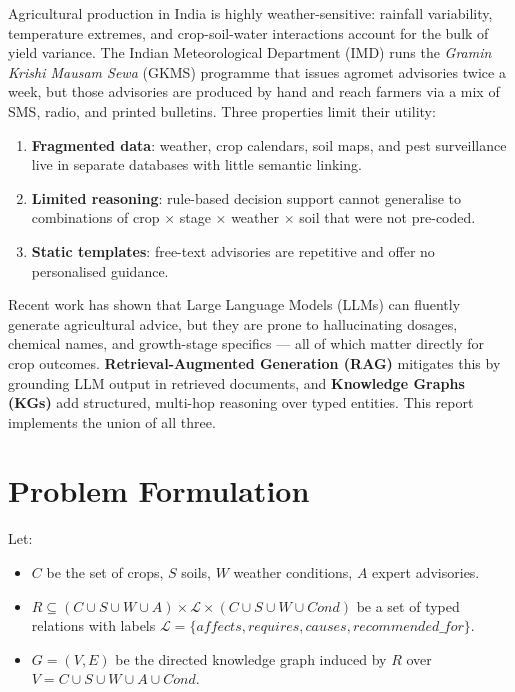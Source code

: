 \documentclass[11pt,a4paper]{article}
\begin{document}
Agricultural production in India is highly weather-sensitive: rainfall
variability, temperature extremes, and crop-soil-water interactions
account for the bulk of yield variance. The Indian Meteorological
Department (IMD) runs the \emph{Gramin Krishi Mausam Sewa} (GKMS)
programme that issues agromet advisories twice a week, but those
advisories are produced by hand and reach farmers via a mix of SMS,
radio, and printed bulletins. Three properties limit their utility:

\begin{enumerate}[leftmargin=*]
  \item \textbf{Fragmented data}: weather, crop calendars, soil maps,
        and pest surveillance live in separate databases with little
        semantic linking.
  \item \textbf{Limited reasoning}: rule-based decision support cannot
        generalise to combinations of crop $\times$ stage $\times$
        weather $\times$ soil that were not pre-coded.
  \item \textbf{Static templates}: free-text advisories are repetitive
        and offer no personalised guidance.
\end{enumerate}

Recent work has shown that Large Language Models (LLMs) can fluently
generate agricultural advice, but they are prone to hallucinating
dosages, chemical names, and growth-stage specifics --- all of which
matter directly for crop outcomes. \textbf{Retrieval-Augmented
Generation (RAG)} mitigates this by grounding LLM output in retrieved
documents, and \textbf{Knowledge Graphs (KGs)} add structured,
multi-hop reasoning over typed entities. This report implements the
union of all three.

\section{Problem Formulation}\label{sec:problem}

Let:
\begin{itemize}[leftmargin=*]
  \item $C$ be the set of crops, $S$ soils, $W$ weather conditions,
        $A$ expert advisories.
  \item $R \subseteq (C \cup S \cup W \cup A) \times \mathcal{L} \times
        (C \cup S \cup W \cup \mathit{Cond})$
        be a set of typed relations with labels
        $\mathcal{L} = \{\textit{affects}, \textit{requires},
        \textit{causes}, \textit{recommended\_for}\}$.
  \item $G = (V, E)$ be the directed knowledge graph induced by $R$
        over $V = C \cup S \cup W \cup A \cup \mathit{Cond}$.
\end{itemize}
\end{document}
